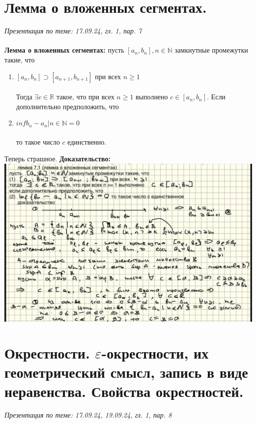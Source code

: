 \documentclass[10pt, a4paper,twocolumn]{article}
\begin{document}
\section{Лемма о вложенных сегментах.}
\textsl{Презентация по теме: 17.09.24, гл. 1, пар. 7}
\\ \\ \textbf{Лемма о вложенных сегментах:} пусть $[a_{n}, b_{n}], n \in \mathbb{N}$ замкнутные промежутки такие, что
\begin{enumerate}
    \item $[a_{n}, b_{n}] \supset [a_{n+1}, b_{n+1}]$ при всех $n \geq 1$
\\ \\Тогда $\exists c \in \mathbb{R}$ такое, что при всех $n \geq 1$ выполнено $c \in [a_{n}, b_{n}]$. Если дополнительно предположить, что 
    \item $inf {b_{n} - a_{n}|n \in \mathbb{N}} = 0$
\\ \\то такое число $c$ единственно.
\end{enumerate}
Теперь страшное. \textbf{Доказательство:}
\\ \includegraphics[width=1\linewidth]{lemmasegm}

\section{Окрестности. $\varepsilon $-окрестности, их геометрический смысл, запись в виде неравенства. Свойства окрестностей.}
\textsl{Презентация по теме: 17.09.24, 19.09.24, гл. 1, пар. 8}
\end{document}
